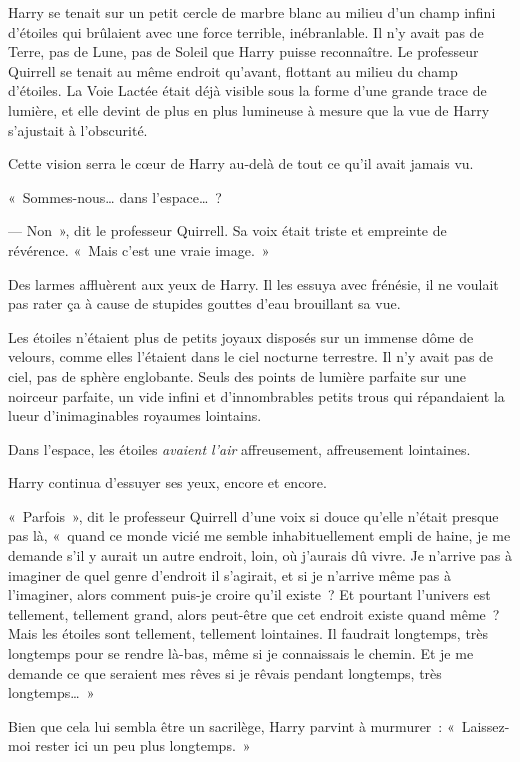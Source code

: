 Harry se tenait sur un petit cercle de marbre blanc au milieu d'un champ infini d'étoiles qui brûlaient avec une force terrible, inébranlable. Il n'y avait pas de Terre, pas de Lune, pas de Soleil que Harry puisse reconnaître. Le professeur Quirrell se tenait au même endroit qu'avant, flottant au milieu du champ d'étoiles. La Voie Lactée était déjà visible sous la forme d'une grande trace de lumière, et elle devint de plus en plus lumineuse à mesure que la vue de Harry s'ajustait à l'obscurité.

Cette vision serra le cœur de Harry au-delà de tout ce qu'il avait jamais vu.

«~Sommes-nous… dans l'espace…~?

--- Non~», dit le professeur Quirrell. Sa voix était triste et empreinte de révérence. «~Mais c'est une vraie image.~»

Des larmes affluèrent aux yeux de Harry. Il les essuya avec frénésie, il ne voulait pas rater ça à cause de stupides gouttes d'eau brouillant sa vue.

Les étoiles n'étaient plus de petits joyaux disposés sur un immense dôme de velours, comme elles l'étaient dans le ciel nocturne terrestre. Il n'y avait pas de ciel, pas de sphère englobante. Seuls des points de lumière parfaite sur une noirceur parfaite, un vide infini et d'innombrables petits trous qui répandaient la lueur d'inimaginables royaumes lointains.

Dans l'espace, les étoiles \emph{avaient l'air} affreusement, affreusement lointaines.

Harry continua d'essuyer ses yeux, encore et encore.

«~Parfois~», dit le professeur Quirrell d'une voix si douce qu'elle n'était presque pas là, «~quand ce monde vicié me semble inhabituellement empli de haine, je me demande s'il y aurait un autre endroit, loin, où j'aurais dû vivre. Je n'arrive pas à imaginer de quel genre d'endroit il s'agirait, et si je n'arrive même pas à l'imaginer, alors comment puis-je croire qu'il existe~? Et pourtant l'univers est tellement, tellement grand, alors peut-être que cet endroit existe quand même~? Mais les étoiles sont tellement, tellement lointaines. Il faudrait longtemps, très longtemps pour se rendre là-bas, même si je connaissais le chemin. Et je me demande ce que seraient mes rêves si je rêvais pendant longtemps, très longtemps…~»

Bien que cela lui sembla être un sacrilège, Harry parvint à murmurer~: «~Laissez-moi rester ici un peu plus longtemps.~»

